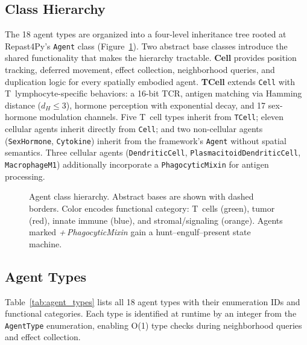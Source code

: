 \subsection{Class Hierarchy}
\label{subsec:md_hierarchy}

The 18 agent types are organized into a four-level inheritance tree rooted at Repast4Py's \texttt{Agent} class (Figure~\ref{fig:agent_hierarchy}).  Two abstract base classes introduce the shared functionality that makes the hierarchy tractable.  \textbf{Cell} provides position tracking, deferred movement, effect collection, neighborhood queries, and duplication logic for every spatially embodied agent.  \textbf{TCell} extends \texttt{Cell} with T~lymphocyte-specific behaviors: a 16-bit TCR, antigen matching via Hamming distance ($d_H \leq 3$), hormone perception with exponential decay, and 17 sex-hormone modulation channels.  Five T~cell types inherit from \texttt{TCell}; eleven cellular agents inherit directly from \texttt{Cell}; and two non-cellular agents (\texttt{SexHormone}, \texttt{Cytokine}) inherit from the framework's \texttt{Agent} without spatial semantics.  Three cellular agents (\texttt{DendriticCell}, \texttt{PlasmacitoidDendriticCell}, \texttt{MacrophageM1}) additionally incorporate a \texttt{PhagocyticMixin} for antigen processing.

\begin{figure}[htbp]
\centering
{}
\caption{Agent class hierarchy.  Abstract bases are shown with dashed borders.  Color encodes functional category: T~cells (green), tumor (red), innate immune (blue), and stromal/signaling (orange).  Agents marked \emph{+\,PhagocyticMixin} gain a hunt--engulf--present state machine.}
\label{fig:agent_hierarchy}
\end{figure}

\FloatBarrier
\subsection{Agent Types}
\label{subsec:md_agent_types}

Table~\ref{tab:agent_types} lists all 18 agent types with their enumeration IDs and functional categories.  Each type is identified at runtime by an integer from the \texttt{AgentType} enumeration, enabling O(1) type checks during neighborhood queries and effect collection.

